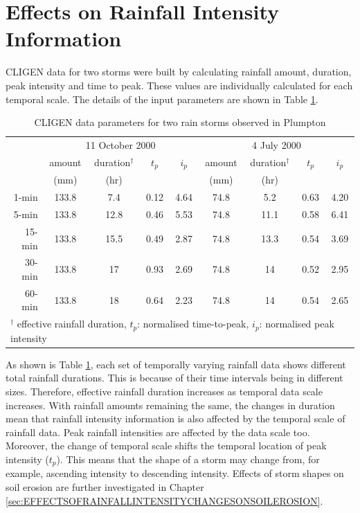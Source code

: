 \section{Effects on Rainfall Intensity Information}
\label{sec:EffectsOnRainfallIntensityInput}

CLIGEN data for two storms were built by calculating rainfall amount, duration,
peak intensity and time to peak. These values are individually calculated for
each temporal scale. The details of the input parameters are shown in Table
\ref{tab:CLIGENWEPPInputFileParameters}.

\begin{table}[htbp]
  \centering
  \small
  \caption{CLIGEN data parameters for two rain storms observed in
Plumpton}
  \label{tab:CLIGENWEPPInputFileParameters}
    \begin{tabular}{rcccccccc} \toprule
       & \multicolumn{4}{c}{11 October 2000} &
\multicolumn{4}{c}{4 July 2000}\\
       \cmidrule(r){2-5} \cmidrule(l){6-9}
       & amount & duration$^{\dagger}$ & $t_p$ & $i_p$ & amount &
duration$^{\dagger}$ & $t_p$ & $i_p$\\
       & \scriptsize(mm) & \scriptsize(hr) & & & \scriptsize(mm) &
\scriptsize(hr) & & \\
       \midrule
      1-min  & 133.8 & 7.4  & 0.12 & 4.64 & 74.8 & 5.2  & 0.63 & 4.20\\
      5-min  & 133.8 & 12.8 & 0.46 & 5.53 & 74.8 & 11.1 & 0.58 & 6.41\\
      15-min & 133.8 & 15.5 & 0.49 & 2.87 & 74.8 & 13.3 & 0.54 & 3.69\\
      30-min & 133.8 & 17   & 0.93 & 2.69 & 74.8 & 14   & 0.52 & 2.95\\
      60-min & 133.8 & 18   & 0.64 & 2.23 & 74.8 & 14   & 0.54 & 2.65\\
      \bottomrule
      \multicolumn{9}{l}{\footnotesize $^\dagger$ effective rainfall
duration, {\normalsize{$t_p$}}: normalised time-to-peak, {\normalsize{$i_p$}}:
normalised peak intensity}
    \end{tabular}
\end{table}

As shown is Table \ref{tab:CLIGENWEPPInputFileParameters}, each set of
temporally varying rainfall data shows different total rainfall durations. This
is because of their time intervals being in different sizes. Therefore,
effective rainfall duration increases as temporal data scale increases. With
rainfall amounts remaining the same, the changes in duration mean that rainfall
intensity information is also affected by the temporal scale of rainfall data.
Peak rainfall intensities are affected by the data scale too. Moreover, the
change of temporal scale shifts the temporal location of peak intensity
($t_p$). This means that the shape of a storm may change from, for example,
ascending intensity to descending intensity. Effects of storm shapes on soil
erosion are further investigated in Chapter
\ref{sec:EFFECTSOFRAINFALLINTENSITYCHANGESONSOILEROSION}.

